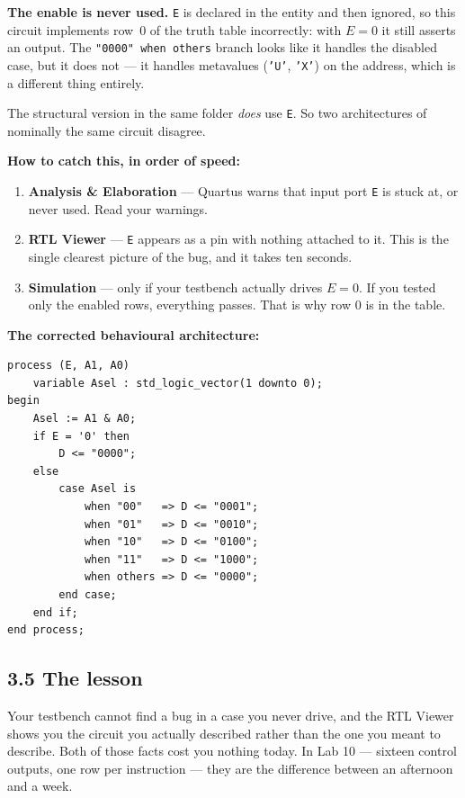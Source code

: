 \documentclass[11pt]{article}
\newcommand{\code}[1]{\texttt{#1}}
\begin{document}
\textbf{The enable is never used.} \code{E} is declared in the entity and then
ignored, so this circuit implements row~0 of the truth table incorrectly: with
$E = 0$ it still asserts an output. The \code{"0000" when others} branch looks like
it handles the disabled case, but it does not --- it handles metavalues
(\code{'U'}, \code{'X'}) on the address, which is a different thing entirely.

The structural version in the same folder \emph{does} use \code{E}. So two
architectures of nominally the same circuit disagree.

\textbf{How to catch this, in order of speed:}

\begin{enumerate}[leftmargin=2em,itemsep=1pt]
\item \textbf{Analysis \& Elaboration} --- Quartus warns that input port \code{E} is
stuck at, or never used. Read your warnings.
\item \textbf{RTL Viewer} --- \code{E} appears as a pin with nothing attached to it.
This is the single clearest picture of the bug, and it takes ten seconds.
\item \textbf{Simulation} --- only if your testbench actually drives $E = 0$. If you
tested only the enabled rows, everything passes. That is why row 0 is in the table.
\end{enumerate}

\textbf{The corrected behavioural architecture:}

\begin{lstlisting}
process (E, A1, A0)
    variable Asel : std_logic_vector(1 downto 0);
begin
    Asel := A1 & A0;
    if E = '0' then
        D <= "0000";
    else
        case Asel is
            when "00"   => D <= "0001";
            when "01"   => D <= "0010";
            when "10"   => D <= "0100";
            when "11"   => D <= "1000";
            when others => D <= "0000";
        end case;
    end if;
end process;
\end{lstlisting}

\subsection*{3.5 The lesson}

Your testbench cannot find a bug in a case you never drive, and the RTL Viewer shows
you the circuit you actually described rather than the one you meant to describe.
Both of those facts cost you nothing today. In Lab 10 --- sixteen control outputs,
one row per instruction --- they are the difference between an afternoon and a week.
\end{document}
